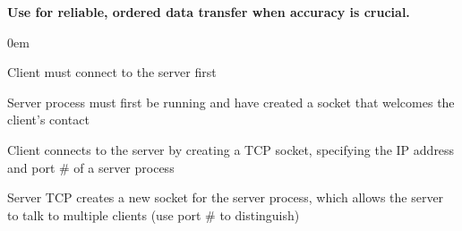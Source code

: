 \documentclass[letterpaper,8pt]{extarticle}
\let\olditemize\itemize \let\endolditemize\enditemize
\renewenvironment{itemize}{\olditemize \itemsep0em}{\endolditemize}
\begin{document}
\begin{multicols*}{5}
\begin{center}
\begin{tikzpicture}[
      node distance=4cm,
      stage/.style={},
      arrow/.style={-Stealth, thick},
      data/.style={midway, above, font=\small}
    ]
  \end{tikzpicture}

\end{center}

\textbf{Use for reliable, ordered data transfer when accuracy is crucial.}

\begin{itemize}
  \item Client must connect to the server first
  \item Server process must first be running and have created a socket that welcomes the client's contact
  \item Client connects to the server by creating a TCP socket, specifying the IP address and port \# of a server process
  \item Server TCP creates a new socket for the server process, which allows the server to talk to multiple clients (use port \# to distinguish)
\end{itemize}

\end{multicols*}
\end{document}
